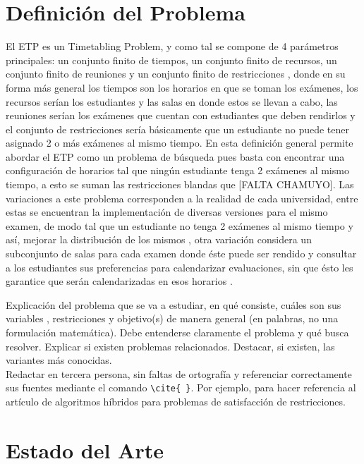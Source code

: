 \documentclass[letter, 10pt]{article}
\begin{document}
\section{Definici\'on del Problema}

El ETP es un Timetabling Problem, y como tal se compone de 4 parámetros principales: un conjunto finito de tiempos, un conjunto finito de recursos, un conjunto finito de reuniones y un conjunto finito de restricciones \cite{Qu2009}, donde en su forma más general los tiempos son los horarios en que se toman los exámenes, los recursos serían los estudiantes y las salas en donde estos se llevan a cabo, las reuniones serían los exámenes que cuentan con estudiantes que deben rendirlos y el conjunto de restricciones sería básicamente que un estudiante no puede tener asignado 2 o más exámenes al mismo tiempo. En esta definición general permite abordar el ETP como un problema de búsqueda pues basta con encontrar una configuración de horarios tal que ningún estudiante tenga 2 exámenes al mismo tiempo, a esto se suman las restricciones blandas que [FALTA CHAMUYO]. Las variaciones a este problema corresponden a la realidad de cada universidad, entre estas se encuentran la implementación de diversas versiones para el mismo examen, de modo tal que un estudiante no tenga 2 exámenes al mismo tiempo y así, mejorar la distribución de los mismos \cite{WOUMANS2016178}, otra variación considera un subconjunto de salas para cada examen donde éste puede ser rendido y consultar a los estudiantes sus preferencias para calendarizar evaluaciones, sin que ésto les garantice que serán calendarizadas en esos horarios \cite{LAPORTE1984351}.




Explicaci\'on del problema que se va a estudiar, en qu\'e consiste, cu\'ales son sus variables , restricciones y objetivo(s) de manera general (en palabras, no una formulaci\'on matem\'atica). Debe entenderse claramente el problema y qu\'e busca resolver.
Explicar si existen problemas relacionados.
Destacar, si existen, las variantes m\'as conocidas.\\
Redactar en tercera persona, sin faltas de ortograf\'ia y referenciar correctamente sus fuentes mediante el comando  \verb+\cite{ }+. Por ejemplo, para hacer referencia al art\'iculo de algoritmos h\'ibridos para problemas de satisfacci\'on 
 de restricciones.

\section{Estado del Arte}
\end{document}
